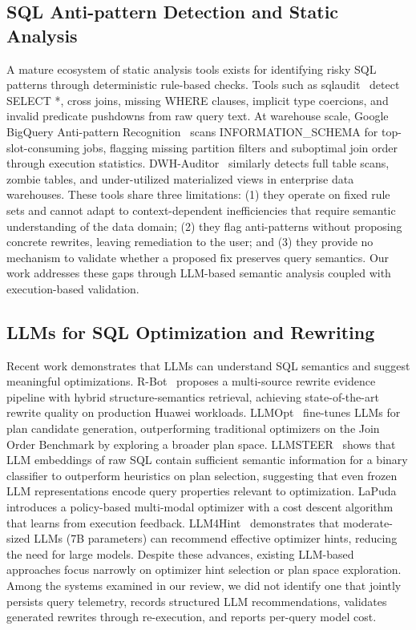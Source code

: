 \documentclass[conference]{IEEEtran}
\begin{document}
\subsection{SQL Anti-pattern Detection and Static Analysis}
A mature ecosystem of static analysis tools exists for identifying risky SQL patterns through deterministic rule-based checks. Tools such as sqlaudit~\cite{sqlaudit} detect SELECT *, cross joins, missing WHERE clauses, implicit type coercions, and invalid predicate pushdowns from raw query text. At warehouse scale, Google BigQuery Anti-pattern Recognition~\cite{gcpantipattern} scans INFORMATION\_SCHEMA for top-slot-consuming jobs, flagging missing partition filters and suboptimal join order through execution statistics. DWH-Auditor~\cite{dwhauditor} similarly detects full table scans, zombie tables, and under-utilized materialized views in enterprise data warehouses. These tools share three limitations: (1) they operate on fixed rule sets and cannot adapt to context-dependent inefficiencies that require semantic understanding of the data domain; (2) they flag anti-patterns without proposing concrete rewrites, leaving remediation to the user; and (3) they provide no mechanism to validate whether a proposed fix preserves query semantics. Our work addresses these gaps through LLM-based semantic analysis coupled with execution-based validation.

\subsection{LLMs for SQL Optimization and Rewriting}
Recent work demonstrates that LLMs can understand SQL semantics and suggest meaningful optimizations. R-Bot~\cite{rbot2025} proposes a multi-source rewrite evidence pipeline with hybrid structure-semantics retrieval, achieving state-of-the-art rewrite quality on production Huawei workloads. LLMOpt~\cite{llmopt2025} fine-tunes LLMs for plan candidate generation, outperforming traditional optimizers on the Join Order Benchmark by exploring a broader plan space. LLMSTEER~\cite{llmsteer2024} shows that LLM embeddings of raw SQL contain sufficient semantic information for a binary classifier to outperform heuristics on plan selection, suggesting that even frozen LLM representations encode query properties relevant to optimization. LaPuda~\cite{lapuda2024} introduces a policy-based multi-modal optimizer with a cost descent algorithm that learns from execution feedback. LLM4Hint~\cite{llm4hint2025} demonstrates that moderate-sized LLMs (7B parameters) can recommend effective optimizer hints, reducing the need for large models. Despite these advances, existing LLM-based approaches focus narrowly on optimizer hint selection or plan space exploration. Among the systems examined in our review, we did not identify one that jointly persists query telemetry, records structured LLM recommendations, validates generated rewrites through re-execution, and reports per-query model cost.
\end{document}
